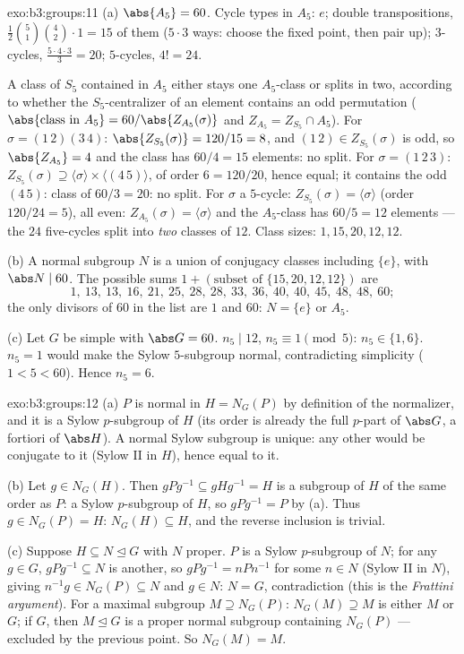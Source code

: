 \begin{solution}{exo:b3:groups:11}
(a) $\abs{A_5} = 60$. Cycle types in $A_5$: $e$; double
transpositions, $\frac{1}{2}\binom{5}{1}\binom{4}{2}\cdot 1 = 15$
of them ($5 \cdot 3$ ways: choose the fixed point, then pair up);
$3$-cycles, $\frac{5 \cdot 4 \cdot 3}{3} = 20$; $5$-cycles, $4! =
24$.

A class of $S_5$ contained in $A_5$ either stays one $A_5$-class
or splits in two, according to whether the $S_5$-centralizer of an
element contains an odd permutation ($\abs{\text{class in }A_5} =
60/\abs{Z_{A_5}(\sigma)}$ and $Z_{A_5} = Z_{S_5} \cap A_5$).
For $\sigma = (1\,2)(3\,4)$: $\abs{Z_{S_5}(\sigma)} = 120/15 = 8$,
and $(1\,2) \in Z_{S_5}(\sigma)$ is odd, so $\abs{Z_{A_5}} = 4$
and the class has $60/4 = 15$ elements: no split. For $\sigma =
(1\,2\,3)$: $Z_{S_5}(\sigma) \supseteq \langle \sigma \rangle
\times \langle (4\,5)\rangle$, of order $6 = 120/20$, hence equal;
it contains the odd $(4\,5)$: class of $60/3 = 20$: no split. For
$\sigma$ a $5$-cycle: $Z_{S_5}(\sigma) = \langle \sigma\rangle$
(order $120/24 = 5$), all even: $Z_{A_5}(\sigma) = \langle
\sigma\rangle$ and the $A_5$-class has $60/5 = 12$ elements --- the
$24$ five-cycles split into \emph{two} classes of $12$. Class
sizes: $1, 15, 20, 12, 12$.

(b) A normal subgroup $N$ is a union of conjugacy classes
including $\{e\}$, with $\abs N \mid 60$. The possible sums $1 +
(\text{subset of } \{15, 20, 12, 12\})$ are
\[
1,\ 13,\ 13,\ 16,\ 21,\ 25,\ 28,\ 28,\ 33,\ 36,\ 40,\ 40,\ 45,\
48,\ 48,\ 60 ;
\]
the only divisors of $60$ in the list are $1$ and $60$: $N =
\{e\}$ or $A_5$.

(c) Let $G$ be simple with $\abs G = 60$. $n_5 \mid 12$, $n_5
\equiv 1 \pmod 5$: $n_5 \in \{1, 6\}$. $n_5 = 1$ would make the
Sylow $5$-subgroup normal, contradicting simplicity ($1 < 5 <
60$). Hence $n_5 = 6$.
\end{solution}

\begin{solution}{exo:b3:groups:12}
(a) $P$ is normal in $H = N_G(P)$ by definition of the
normalizer, and it is a Sylow $p$-subgroup of $H$ (its order is
already the full $p$-part of $\abs G$, a fortiori of $\abs H$).
A normal Sylow subgroup is unique: any other would be
conjugate to it (Sylow II in $H$), hence equal to it.

(b) Let $g \in N_G(H)$. Then $gPg^{-1} \subseteq gHg^{-1} = H$
is a subgroup of $H$ of the same order as $P$: a Sylow
$p$-subgroup of $H$, so $gPg^{-1} = P$ by (a). Thus $g \in
N_G(P) = H$: $N_G(H) \subseteq H$, and the reverse inclusion is
trivial.

(c) Suppose $H \subseteq N \trianglelefteq G$ with $N$ proper.
$P$ is a Sylow $p$-subgroup of $N$; for any $g \in G$,
$gPg^{-1} \subseteq N$ is another, so $gPg^{-1} = nPn^{-1}$ for
some $n \in N$ (Sylow II in $N$), giving $n^{-1}g \in N_G(P)
\subseteq N$ and $g \in N$: $N = G$, contradiction (this is the
\emph{Frattini argument}). For a maximal subgroup $M \supseteq
N_G(P)$: $N_G(M) \supseteq M$ is either $M$ or $G$; if $G$,
then $M \trianglelefteq G$ is a proper normal subgroup
containing $N_G(P)$ --- excluded by the previous point. So
$N_G(M) = M$.
\end{solution}

